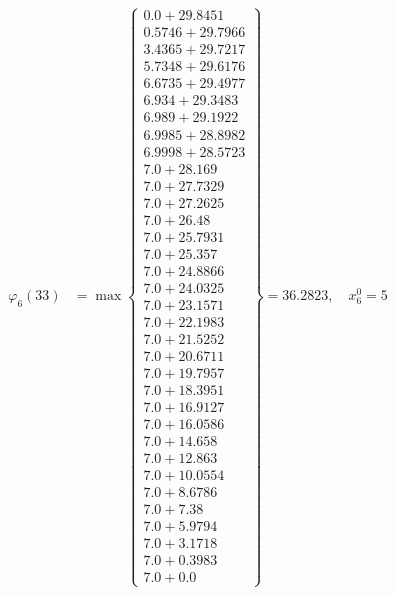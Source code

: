 \documentclass{article}
\begin{document}
\begin{align*}
\varphi_{6}(33) &= \max \left\{ \begin{array}{c}
0.0 + 29.8451 \\
 0.5746 + 29.7966 \\
 3.4365 + 29.7217 \\
 5.7348 + 29.6176 \\
 6.6735 + 29.4977 \\
 6.934 + 29.3483 \\
 6.989 + 29.1922 \\
 6.9985 + 28.8982 \\
 6.9998 + 28.5723 \\
 7.0 + 28.169 \\
 7.0 + 27.7329 \\
 7.0 + 27.2625 \\
 7.0 + 26.48 \\
 7.0 + 25.7931 \\
 7.0 + 25.357 \\
 7.0 + 24.8866 \\
 7.0 + 24.0325 \\
 7.0 + 23.1571 \\
 7.0 + 22.1983 \\
 7.0 + 21.5252 \\
 7.0 + 20.6711 \\
 7.0 + 19.7957 \\
 7.0 + 18.3951 \\
 7.0 + 16.9127 \\
 7.0 + 16.0586 \\
 7.0 + 14.658 \\
 7.0 + 12.863 \\
 7.0 + 10.0554 \\
 7.0 + 8.6786 \\
 7.0 + 7.38 \\
 7.0 + 5.9794 \\
 7.0 + 3.1718 \\
 7.0 + 0.3983 \\
 7.0 + 0.0
\end{array} \right\}=36.2823, \quad x_{6}^0=5\\
  

\end{align*}
\end{document}
